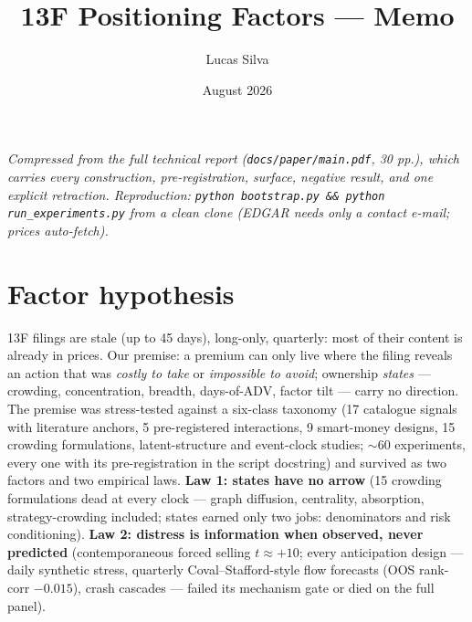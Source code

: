 \documentclass[10pt]{article}
\title{\vspace{-22pt}\large\textbf{13F Positioning Factors --- Memo}}
\author{\normalsize Lucas Silva}
\date{\normalsize August 2026}
\begin{document}
\maketitle
\vspace{-26pt}

{\footnotesize\emph{Compressed from the full technical report
(\texttt{docs/paper/main.pdf}, 30 pp.), which carries every
construction, pre-registration, surface, negative result, and one
explicit retraction. Reproduction: \texttt{python bootstrap.py \&\&
python run\_experiments.py} from a clean clone (EDGAR needs only a
contact e-mail; prices auto-fetch).}}

\section{Factor hypothesis}

13F filings are stale (up to 45 days), long-only, quarterly: most of
their content is already in prices. Our premise: a premium can only
live where the filing reveals an action that was \emph{costly to
take} or \emph{impossible to avoid}; ownership \emph{states} ---
crowding, concentration, breadth, days-of-ADV, factor tilt --- carry
no direction. The premise was stress-tested against a six-class
taxonomy (17 catalogue signals with literature anchors, 5
pre-registered interactions, 9 smart-money designs, 15 crowding
formulations, latent-structure and event-clock studies; $\sim$60
experiments, every one with its pre-registration in the script
docstring) and survived as two factors and two empirical laws.
\textbf{Law 1: states have no arrow} (15 crowding formulations dead
at every clock --- graph diffusion, centrality, absorption,
strategy-crowding included; states earned only two jobs:
denominators and risk conditioning). \textbf{Law 2: distress is
information when observed, never predicted} (contemporaneous forced
selling $t\approx+10$; every anticipation design --- daily synthetic
stress, quarterly Coval--Stafford-style flow forecasts (OOS rank-corr
$-0.015$), crash cascades --- failed its mechanism gate or died on
the full panel).
\end{document}
